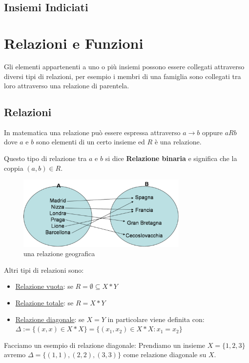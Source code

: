 \documentclass{article}
\begin{document}
\subsection{Insiemi Indiciati}




\newpage
\section{Relazioni e Funzioni}
Gli elementi appartenenti a uno o più insiemi possono essere collegati attraverso diversi tipi di relazioni, per esempio i membri di una famiglia sono collegati tra loro attraverso una relazione di parentela. \par

\subsection{Relazioni}
In matematica una relazione può essere espressa attraverso $ a \to b$ oppure $ a R b $ dove $ a $ e $ b $ sono elementi di un certo insieme ed $ R $ è una relazione. \par
Questo tipo di relazione tra $ a $ e $ b $ si dice \textbf{Relazione binaria} e significa che la coppia $ (a,b) \in R $. \par

\begin{figure}[h]
        \centering
                \includegraphics[width=0.75\textwidth]{relazioni.png}
        \caption{una relazione geografica}\label{fig:esempio_relazione}
\end{figure}

Altri tipi di relazioni sono:
\begin{itemize}
        \item \underline{Relazione vuota}: se $ R = \emptyset \subseteq X*Y $ 
        \item \underline{Relazione totale}: se $ R = X*Y $ 
        \item \underline{Relazione diagonale}: se $ X=Y $ in particolare viene definita con: \newline $ \Delta := \{(x,x) \in X*X\} = \{(x_1,x_2) \in X*X : x_1 = x_2\} $  
\end{itemize}
Facciamo un esempio di relazione diagonale: \newline
Prendiamo un insieme $ X = \{1,2,3\} $ avremo $ \Delta = \{(1,1), (2,2),(3,3)\} $ come relazione diagonale su $ X $.
\end{document}
